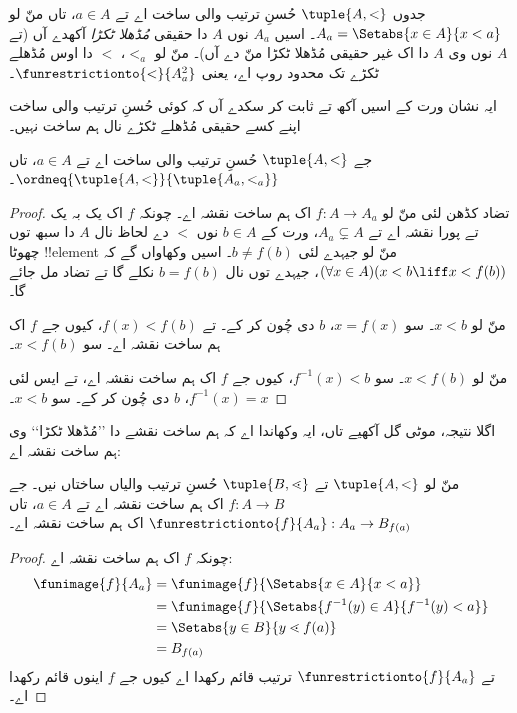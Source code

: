 \documentclass[../../../include/open-logic-section]{subfiles}
\begin{document}
\begin{defn}
جدوں $\tuple{A, <}$ حُسنِ ترتیب والی ساخت اے تے $a \in A$، تاں منّ لو
$A_a = \Setabs{x \in A}{x < a}$۔ اسیں $A_a$ نوں $A$ دا حقیقی
\emph{مُڈھلا ٹکڑا} آکھدے آں (تے $A$ نوں وی $A$ دا اک غیر حقیقی مُڈھلا
ٹکڑا منّ دے آں)۔ منّ لو $<_a$، $<$ دا اوس مُڈھلے ٹکڑے تک محدود روپ اے،
یعنی $\funrestrictionto{\mathord{<}}{A_a^2}$۔
\end{defn}
\noindent
ایہ نشان ورت کے اسیں آکھ تے ثابت کر سکدے آں کہ کوئی حُسنِ ترتیب والی
ساخت اپنے کسے حقیقی مُڈھلے ٹکڑے نال ہم ساخت نہیں۔

\begin{lem}
جے $\tuple{A, <}$ حُسنِ ترتیب والی ساخت اے تے $a \in A$، تاں
$\ordneq{\tuple{A, <}}{\tuple{A_a, <_a}}$۔
\end{lem}

\begin{proof}
تضاد کڈھن لئی منّ لو $f \colon A \to A_a$ اک ہم ساخت نقشہ اے۔
چونکہ $f$ اک یک بہ یک تے پورا نقشہ اے تے $A_a \subsetneq A$،
 ورت کے $b \in A$ نوں $<$ دے لحاظ نال $A$ دا
سبھ توں چھوٹا !!{element} منّ لو جیہدے لئی $b \neq f(b)$۔ اسیں وکھاواں گے
کہ $(\forall x \in A)(x<b \liff x < f(b))$، جیہدے توں
 نال
$b = f(b)$ نکلے گا تے تضاد مل جائے گا۔

منّ لو $x < b$۔ سو $x = f(x)$، $b$ دی چُون کر کے۔ تے $f(x) < f(b)$،
کیوں جے $f$ اک ہم ساخت نقشہ اے۔ سو $x < f(b)$۔

منّ لو $x < f(b)$۔ سو $f^{-1}(x) < b$، کیوں جے $f$ اک ہم ساخت نقشہ اے،
تے ایس لئی $f^{-1}(x) = x$، $b$ دی چُون کر کے۔ سو $x < b$۔
\end{proof}

اگلا نتیجہ، موٹی گل آکھیے تاں، ایہ وکھاندا اے کہ ہم ساخت نقشے دا
’’مُڈھلا ٹکڑا‘‘ وی ہم ساخت نقشہ اے:

\begin{lem}
منّ لو $\tuple{A, <}$ تے $\tuple{B, \lessdot}$ حُسنِ ترتیب والیاں ساختاں
نیں۔ جے $f \colon A \to B$ اک ہم ساخت نقشہ اے تے $a \in A$، تاں
$\funrestrictionto{f}{A_{a}} : A_a \to B_{f(a)}$ اک ہم ساخت نقشہ اے۔
\end{lem}

\begin{proof}
چونکہ $f$ اک ہم ساخت نقشہ اے:
\begin{align*}
	\funimage{f}{A_a} &= \funimage{f}{\Setabs{x \in A}{x < a}}\\
	&= \funimage{f}{\Setabs{f^{-1}(y) \in A}{f^{-1}(y) < a}} \\
	&= \Setabs{y \in B}{y \lessdot f(a)} \\
	&=B_{f(a)}
\end{align*}
تے $\funrestrictionto{f}{A_a}$ ترتیب قائم رکھدا اے کیوں جے $f$ اینوں قائم رکھدا اے۔
\end{proof}
\end{document}
